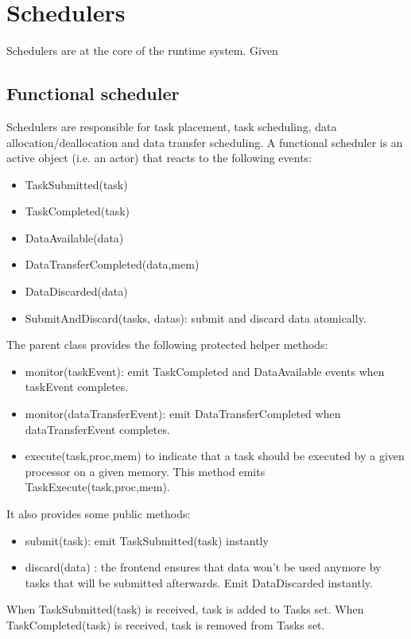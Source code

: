 \chapter{Schedulers}

Schedulers are at the core of the runtime system.
Given 


\section{Functional scheduler}
Schedulers are responsible for task placement, task scheduling, data allocation/deallocation and data transfer scheduling.
A functional scheduler is an active object (i.e. an actor) that reacts to the following events:
\begin{itemize}
  \item TaskSubmitted(task)
  \item TaskCompleted(task)
  \item DataAvailable(data)
  \item DataTransferCompleted(data,mem)
  \item DataDiscarded(data)
  \item SubmitAndDiscard(tasks, datas): submit and discard data atomically.
\end{itemize}

The parent class provides the following protected helper methods:
\begin{itemize}
  \item monitor(taskEvent): emit TaskCompleted and DataAvailable events when taskEvent completes.
  \item monitor(dataTransferEvent): emit DataTransferCompleted when dataTransferEvent completes.
  \item execute(task,proc,mem) to indicate that a task should be executed by a given processor on a given memory. This method emits TaskExecute(task,proc,mem).
\end{itemize}
It also provides some public methods:
\begin{itemize}
  \item submit(task): emit TaskSubmitted(task) instantly
  \item discard(data) : the frontend ensures that data won't be used anymore by tasks that will be submitted afterwards. Emit DataDiscarded instantly.
\end{itemize}

When TaskSubmitted(task) is received, task is added to Tasks set.
When TaskCompleted(task) is received, task is removed from Tasks set.

